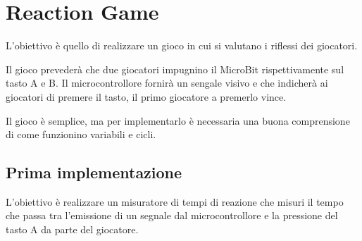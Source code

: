 \documentclass[../../docenti.tex]{subfiles}
\begin{document}
\section{Reaction Game}
L'obiettivo è quello di realizzare un gioco in cui si valutano i riflessi dei giocatori.

Il gioco prevederà che due giocatori impugnino il MicroBit rispettivamente sul tasto A e B.
Il microcontrollore fornirà un sengale visivo e che indicherà ai giocatori di premere il tasto, il primo giocatore a premerlo vince.

Il gioco è semplice, ma per implementarlo è necessaria una buona comprensione di come funzionino variabili e cicli.

\subsection{Prima implementazione}
\label{sec:reaction_game_1}
L'obiettivo è realizzare un misuratore di tempi di reazione che misuri il tempo che passa tra l'emissione di un segnale dal microcontrollore e la pressione del tasto A da parte del giocatore.
\end{document}
